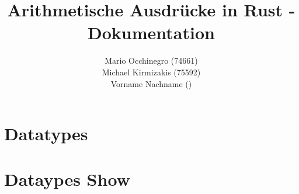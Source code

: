 \documentclass[a4paper, 1ppt]{article}
\title{Arithmetische Ausdrücke in Rust - Dokumentation}
\date{}
\author{
		Mario Occhinegro (74661)\\
		Michael Kirmizakis (75592)\\
		Vorname Nachname ()\\
}
\begin{document}
\nocite{*}
\maketitle
\newpage
\clearpage
\tableofcontents
\setcounter{page}{1}
\newpage
{}
\maketitle
\section{Datatypes}
\section{Dataypes Show}
\end{document}
